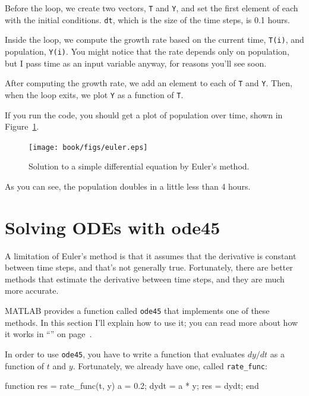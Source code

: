 Before the loop, we create two vectors, {\tt T} and {\tt Y}, and set the first element of each with the initial conditions.  {\tt dt}, which is the size of the time steps, is 0.1 hours.

Inside the loop, we compute the growth rate based on the current time, {\tt T(i)}, and population, {\tt Y(i)}.  You might notice that the rate depends only on population, but I pass time as an input variable anyway, for reasons you'll see soon.

After computing the growth rate, we add an element to each of {\tt T} and {\tt Y}.  Then, when the loop exits, we plot {\tt Y} as a function of {\tt T}.

If you run the code, you should get a plot of population over time, shown in Figure~\ref{fig:euler}. 

\begin{figure}[ht]
\centerline{\texttt{[image: book/figs/euler.eps]}}
\caption{Solution to a simple differential equation by Euler's method.}
\label{fig:euler}
\end{figure}

As you can see, the population doubles in a little less than 4 hours.


\section{Solving ODEs with ode45}
\label{ode45}

A limitation of Euler's method is that it assumes that the derivative is constant between time steps, and that's not generally true.  Fortunately, there are better methods that estimate the derivative between time steps, and they are much more accurate.


MATLAB provides a function called {\tt ode45} that implements one of these methods.  In this section I'll explain how to use it; you can read more about how it works in ``'' on page~\pageref{howode45}.


In order to use {\tt ode45}, you have to write a function that evaluates $dy/dt$ as a function of $t$ and $y$.  Fortunately, we already have one, called \verb"rate_func":

\begin{code}
function res = rate_func(t, y)
   a = 0.2;
   dydt = a * y;
   res = dydt;
end
\end{code}

